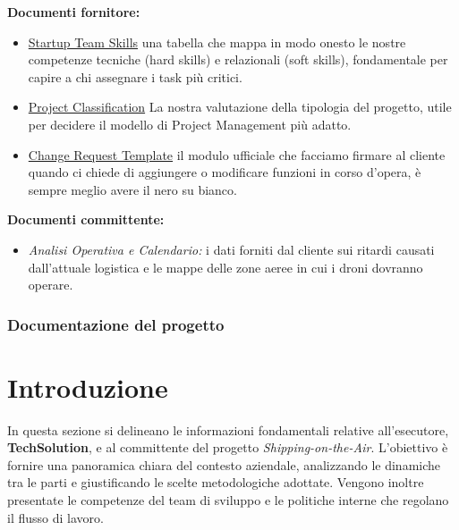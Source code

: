 \documentclass[12pt, a4paper]{article}
\begin{document}
\textbf{Documenti fornitore:}
\begin{itemize}[label=\textbullet]
\item \href{https://raw.githubusercontent.com/schwein69/Project-Management/master/docs/TeamSkills/team_skills.pdf}
{Startup Team Skills}
una tabella che mappa in modo onesto le nostre competenze tecniche (hard skills) e relazionali (soft skills), fondamentale per capire a chi assegnare i task più critici.

\item \href{https://raw.githubusercontent.com/schwein69/Project-Management/master/docs/ProjectClassification/project_classification.pdf}
{Project Classification}
La nostra valutazione della tipologia del progetto, utile per decidere il modello di Project Management più adatto.

\item \href{https://raw.githubusercontent.com/schwein69/Project-Management/master/docs/ProjectModificationRequest/request_template.pdf}
{Change Request Template}
il modulo ufficiale che facciamo firmare al cliente quando ci chiede di aggiungere o modificare funzioni in corso d'opera, è sempre meglio avere il nero su bianco.

\end{itemize}

\textbf{Documenti committente:}
\begin{itemize}[label=\textbullet]
    \item \textit{Analisi Operativa e Calendario:} i dati forniti dal cliente sui ritardi causati dall'attuale logistica e le mappe delle zone aeree in cui i droni dovranno operare.
\end{itemize}

\subsubsection{Documentazione del progetto}

\section{Introduzione}
In questa sezione si delineano le informazioni fondamentali relative all'esecutore, \textbf{TechSolution}, e al committente del progetto \textit{Shipping-on-the-Air}. L'obiettivo è fornire una panoramica chiara del contesto aziendale, analizzando le dinamiche tra le parti e giustificando le scelte metodologiche adottate. Vengono inoltre presentate le competenze del team di sviluppo e le politiche interne che regolano il flusso di lavoro.
\end{document}
